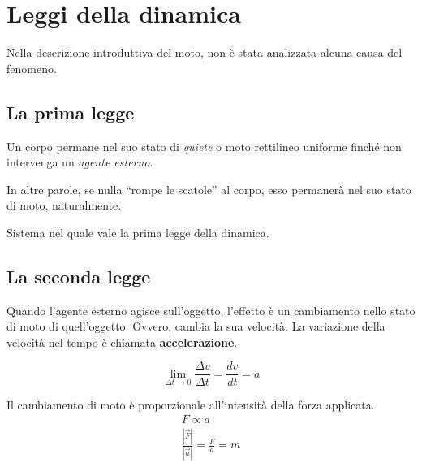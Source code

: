 \marginpar{\minitoc}

\section{Leggi della dinamica}

Nella descrizione introduttiva del moto, non è stata analizzata alcuna causa del
fenomeno.

\subsection{La prima legge}

\vspace{8pt}
\begin{tcolorbox}[colback = red!30, colframe = red!30!black, title = {Prima legge della dinamica (legge di inerzia)}]
    Un corpo permane nel suo stato di \textit{quiete} o moto rettilineo uniforme
    finché non intervenga un \textit{agente esterno}.
\end{tcolorbox}
\vspace{5pt}

In altre parole, se nulla ``rompe le scatole'' al corpo, esso permanerà nel suo
stato di moto, naturalmente.

\vspace{8pt}
\begin{tcolorbox}[colback = yellow!30, colframe = yellow!30!black, title = {Sistema inerziale}]
    Sistema nel quale vale la prima legge della dinamica.
\end{tcolorbox}
\vspace{5pt}

\subsection{La seconda legge}
Quando l'agente esterno agisce sull'oggetto, l'effetto è un cambiamento nello
stato di moto di quell'oggetto. Ovvero, cambia la sua velocità. La variazione
della velocità nel tempo è chiamata \textbf{accelerazione}.

\[ \lim_{\Delta t \to 0} \frac{\Delta v}{\Delta t} = \frac{dv}{dt} = a \]

\vspace{8pt}
\begin{tcolorbox}[colback = red!30, colframe = red!30!black, title = {Seconda legge della dinamica}]
Il cambiamento di moto è proporzionale all'intensità della forza applicata.
    \begin{align}
        F \propto a\\
        \frac{|\overrightarrow{F}|}{|\overrightarrow{a}|} = \frac{F}{a} = m
    \end{align}
\end{tcolorbox}
\vspace{5pt}

